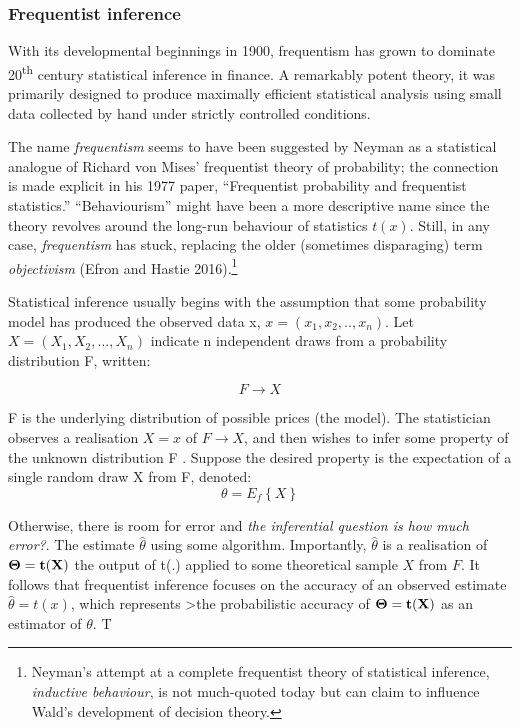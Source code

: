\documentclass{article}
\begin{document}
\hypertarget{frequentist-inference}{%
\subsubsection{Frequentist inference}\label{frequentist-inference}}

With its developmental beginnings in 1900, frequentism has grown to
dominate 20\textsuperscript{th} century statistical inference in
finance. A remarkably potent theory, it was primarily designed to
produce maximally efficient statistical analysis using small data
collected by hand under strictly controlled conditions.

The name \emph{frequentism} seems to have been suggested by Neyman as a
statistical analogue of Richard von Mises' frequentist theory of
probability; the connection is made explicit in his 1977 paper,
``Frequentist probability and frequentist statistics.'' ``Behaviourism''
might have been a more descriptive name since the theory revolves around
the long-run behaviour of statistics \(t(x)\). Still, in any case,
\emph{frequentism} has stuck, replacing the older (sometimes
disparaging) term \emph{objectivism} (Efron and Hastie 2016).\footnote{Neyman's
  attempt at a complete frequentist theory of statistical inference,
  \emph{inductive behaviour}, is not much-quoted today but can claim to
  influence Wald's development of decision theory.}

Statistical inference usually begins with the assumption that some
probability model has produced the observed data x,
\(x=(x_1,x_2,..,x_n)\). Let \(X=(X_1,X_2,...,X_n)\) indicate n
independent draws from a probability distribution F, written:

\[F \to X\]

F is the underlying distribution of possible prices (the model). The
statistician observes a realisation \(X= x\) of \(F \to X\), and then
wishes to infer some property of the unknown distribution F . Suppose
the desired property is the expectation of a single random draw X from
F, denoted: \[\theta=E_f\left\{ X \right\}\]

Otherwise, there is room for error and \emph{the inferential question is
how much error?}. The estimate \(\hat{\theta}\) using some algorithm.
Importantly, \(\hat{\theta}\) is a realisation of \(\bf{\Theta}=t(X)\)
the output of t(.) applied to some theoretical sample \(X\) from \(F\).
It follows that frequentist inference focuses on the accuracy of an
observed estimate \(\hat{\theta}=t(x)\), which represents
\textgreater the probabilistic accuracy of \(\bf{\Theta}=t(X)\) as an
estimator of \(\theta\). T
\end{document}
